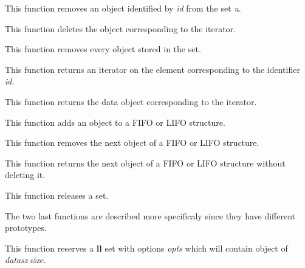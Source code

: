 	  {This function removes an object identified by \textit{id}
	    from the set \textit{u}.}

	  {This function deletes the object corresponding to the iterator.}

	  {This function removes every object stored in the set.}

	  {This function returns an iterator on the element corresponding
	    to the identifier \textit{id}.}

	  {This function returns the data object corresponding to
	    the iterator.}

	  {This function adds an object to a FIFO or LIFO structure.}

	  {This function removes the next object of a FIFO or LIFO structure.}

	  {This function returns the next object of a FIFO or LIFO structure
	    without deleting it.}

	  {This function releases a set.}

The two last functions are  described more specificaly since they have
different prototypes.

	  {This function reserves a \textbf{ll} set with options
	    \textit{opts} which will contain object of \textit{datasz} size.}

